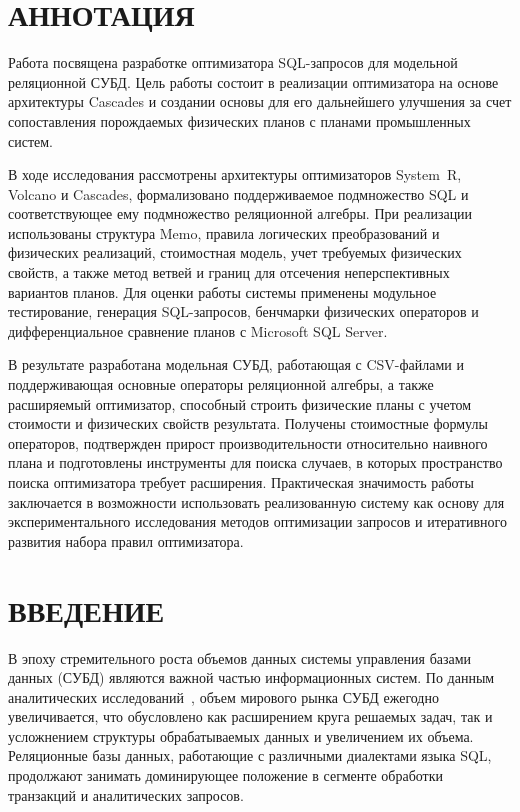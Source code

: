 \documentclass[14pt, russian]{scrartcl}
\newcommand{\anonsection}[1]{\cleardoublepage
\phantomsection %
\addcontentsline{toc}{section}{#1}
\section*{#1}\vspace*{2.5ex} %
}
\begin{document}
\setlength{\tabcolsep}{3pt}
\newpage

\section*{АННОТАЦИЯ}

Работа посвящена разработке оптимизатора SQL-запросов для модельной реляционной
СУБД. Цель работы состоит в реализации оптимизатора на основе архитектуры
Cascades и создании основы для его дальнейшего улучшения за счет сопоставления
порождаемых физических планов с планами промышленных систем.

В ходе исследования рассмотрены архитектуры оптимизаторов System~R, Volcano и
Cascades, формализовано поддерживаемое подмножество SQL и соответствующее ему
подмножество реляционной алгебры. При реализации использованы структура Memo,
правила логических преобразований и физических реализаций, стоимостная модель,
учет требуемых физических свойств, а также метод ветвей и границ для отсечения
неперспективных вариантов планов. Для оценки работы системы применены модульное
тестирование, генерация SQL-запросов, бенчмарки физических операторов и
дифференциальное сравнение планов с Microsoft SQL Server.

В результате разработана модельная СУБД, работающая с CSV-файлами и
поддерживающая основные операторы реляционной алгебры, а также расширяемый
оптимизатор, способный строить физические планы с учетом стоимости и физических
свойств результата. Получены стоимостные формулы операторов, подтвержден прирост
производительности относительно наивного плана и подготовлены инструменты для
поиска случаев, в которых пространство поиска оптимизатора требует расширения.
Практическая значимость работы заключается в возможности использовать
реализованную систему как основу для экспериментального исследования методов
оптимизации запросов и итеративного развития набора правил оптимизатора.

\newpage
\setcounter{page}{5}
\renewcommand\contentsname{\hfill{\normalfont{СОДЕРЖАНИЕ}}\hfill}  %
\tableofcontents
\newpage
\anonsection{ВВЕДЕНИЕ}

В эпоху стремительного роста объемов данных системы управления базами данных
(СУБД) являются важной частью информационных систем. По данным аналитических
исследований~\cite{DBReport}, объем мирового рынка СУБД ежегодно увеличивается,
что обусловлено как расширением круга решаемых задач, так и усложнением
структуры обрабатываемых данных и увеличением их объема. Реляционные базы
данных, работающие с различными диалектами языка SQL, продолжают занимать
доминирующее положение в сегменте обработки транзакций и аналитических запросов.
\end{document}
